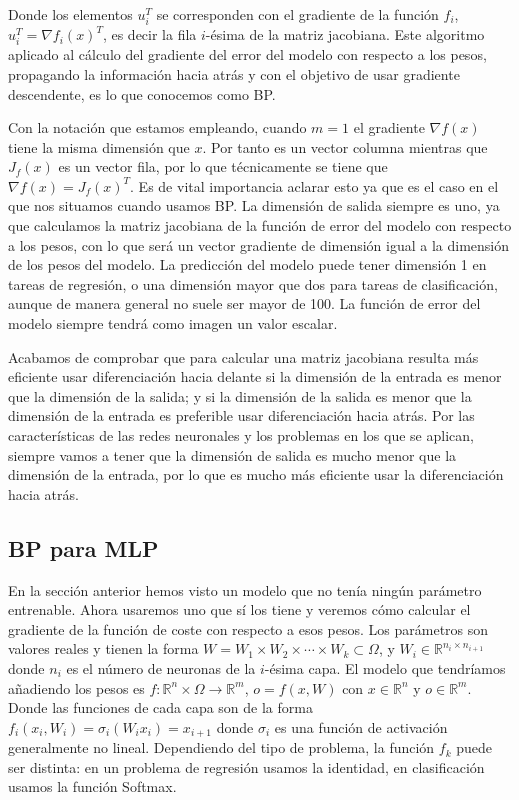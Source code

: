 Donde los elementos $u_i^T$ se corresponden con el gradiente de la función $f_i$, $u_i^T=\nabla f_i(x)^T$, es decir la fila $i$-ésima de la matriz jacobiana. Este algoritmo aplicado al cálculo del gradiente del error del modelo con respecto a los pesos, propagando la información hacia atrás y con el objetivo de usar gradiente descendente, es lo que conocemos como BP.

Con la notación que estamos empleando, cuando $m=1$ el gradiente $\nabla f(x)$ tiene la misma dimensión que $x$. Por tanto es un vector columna mientras que $J_f(x)$ es un vector fila, por lo que técnicamente se tiene que $\nabla f(x)= J_f(x)^T$. Es de vital importancia aclarar esto ya que es el caso en el que nos situamos cuando usamos BP. La dimensión de salida siempre es uno, ya que calculamos la matriz jacobiana de la función de error del modelo con respecto a los pesos, con lo que será un vector gradiente de dimensión igual a la dimensión de los pesos del modelo. La predicción del modelo puede tener dimensión 1 en tareas de regresión, o una dimensión mayor que dos para tareas de clasificación, aunque de manera general no suele ser mayor de 100. La función de error del modelo siempre tendrá como imagen un valor escalar.


Acabamos de comprobar que para calcular una matriz jacobiana resulta más eficiente usar diferenciación hacia delante si la dimensión de la entrada es menor que la dimensión de la salida; y si la dimensión de la salida es menor que la dimensión de la entrada es preferible usar diferenciación hacia atrás. Por las características de las redes neuronales y los problemas en los que se aplican, siempre vamos a tener que la dimensión de salida es mucho menor que la dimensión de la entrada, por lo que es mucho más eficiente usar la diferenciación hacia atrás. 




\subsection{BP para MLP}


En la sección anterior hemos visto un modelo que no tenía ningún parámetro entrenable. Ahora usaremos uno que sí los tiene y veremos cómo calcular el gradiente de la función de coste con respecto a esos pesos. Los parámetros son valores reales y tienen la forma $W= W_1 \times W_2 \times \cdots \times W_k \subset \Omega$, y $W_i \in \mathbb{R}^{n_i \times n_{i+1}}$ donde $n_i$ es el número de neuronas de la $i$-ésima capa. El modelo que tendríamos añadiendo los pesos es $f: \mathbb{R}^n \times \Omega \rightarrow \mathbb{R}^m$, $o=f(x,W)$ con $x \in \mathbb{R}^n$  y $o \in \mathbb{R}^m$. Donde las funciones de cada capa son de la forma $f_i(x_i, W_i)= \sigma_i(W_ix_i)=x_{i+1}$ donde $\sigma_i$ es una función de activación generalmente no lineal. Dependiendo del tipo de problema, la función $f_k$ puede ser distinta: en un problema de regresión usamos la identidad, en clasificación usamos la función Softmax.


